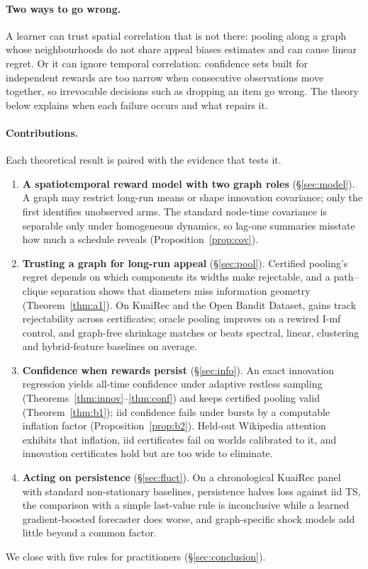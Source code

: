 \documentclass[sigconf,review,anonymous]{acmart}
\begin{document}
\paragraph{Two ways to go wrong.} A learner can trust spatial correlation that is not there: pooling along a graph whose neighbourhoods do not share appeal biases estimates and can cause linear regret. Or it can ignore temporal correlation: confidence sets built for independent rewards are too narrow when consecutive observations move together, so irrevocable decisions such as dropping an item go wrong. The theory below explains when each failure occurs and what repairs it.

\paragraph{Contributions.} Each theoretical result is paired with the evidence that tests it.
\begin{enumerate}
\item \textbf{A spatiotemporal reward model with two graph roles} (\S\ref{sec:model}). A graph may restrict long-run means or shape innovation covariance; only the first identifies unobserved arms. The standard node-time covariance is separable only under homogeneous dynamics, so lag-one summaries misstate how much a schedule reveals (Proposition~\ref{prop:cov}).
\item \textbf{Trusting a graph for long-run appeal} (\S\ref{sec:pool}). Certified pooling's regret depends on which components its widths make rejectable, and a path--clique separation shows that diameters miss information geometry (Theorem~\ref{thm:a1}). On KuaiRec and the Open Bandit Dataset, gains track rejectability across certificates; oracle pooling improves on a rewired I-mf control, and graph-free shrinkage matches or beats spectral, linear, clustering and hybrid-feature baselines on average.
\item \textbf{Confidence when rewards persist} (\S\ref{sec:info}). An exact innovation regression yields all-time confidence under adaptive restless sampling (Theorems~\ref{thm:innov}--\ref{thm:conf}) and keeps certified pooling valid (Theorem~\ref{thm:b1}); iid confidence fails under bursts by a computable inflation factor (Proposition~\ref{prop:b2}). Held-out Wikipedia attention exhibits that inflation, iid certificates fail on worlds calibrated to it, and innovation certificates hold but are too wide to eliminate.
\item \textbf{Acting on persistence} (\S\ref{sec:fluct}). On a chronological KuaiRec panel with standard non-stationary baselines, persistence halves loss against iid TS, the comparison with a simple last-value rule is inconclusive while a learned gradient-boosted forecaster does worse, and graph-specific shock models add little beyond a common factor.
\end{enumerate}
We close with five rules for practitioners (\S\ref{sec:conclusion}).
\end{document}
